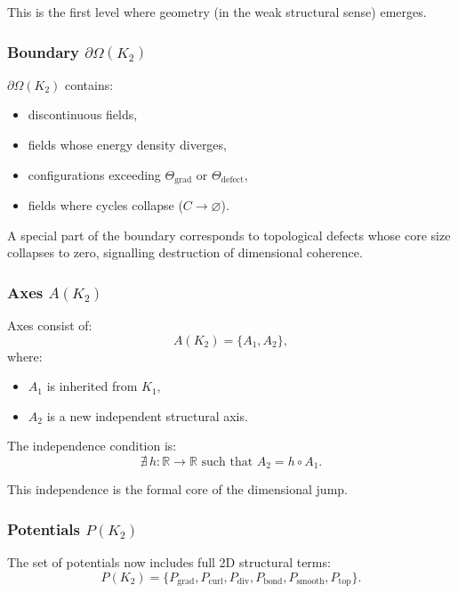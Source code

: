 This is the first level where geometry (in the weak structural sense)
emerges.

\subsubsection{Boundary \texorpdfstring{$\partial\Omega(K_2)$}{\partial\Omega(K_2)}}

$\partial\Omega(K_2)$ contains:
\begin{itemize}
    \item discontinuous fields,
    \item fields whose energy density diverges,
    \item configurations exceeding $\Theta_{\mathrm{grad}}$ or
          $\Theta_{\mathrm{defect}}$,
    \item fields where cycles collapse ($C \to \varnothing$).
\end{itemize}

A special part of the boundary corresponds to topological defects whose
core size collapses to zero, signalling destruction of dimensional
coherence.

\subsubsection{Axes \texorpdfstring{$A(K_2)$}{A(K_2)}}

Axes consist of:
\[
A(K_2) = \{A_1, A_2\},
\]
where:
\begin{itemize}
    \item $A_1$ is inherited from $K_1$,
    \item $A_2$ is a new independent structural axis.
\end{itemize}

The independence condition is:
\[
\nexists\, h: \mathbb{R} \to \mathbb{R} \text{ such that } A_2 = h \circ A_1.
\]

This independence is the formal core of the dimensional jump.

\subsubsection{Potentials \texorpdfstring{$P(K_2)$}{P(K_2)}}

The set of potentials now includes full 2D structural terms:
\[
P(K_2) =
\{ P_{\mathrm{grad}}, P_{\mathrm{curl}}, P_{\mathrm{div}},
   P_{\mathrm{bond}}, P_{\mathrm{smooth}}, P_{\mathrm{top}} \}.
\]


